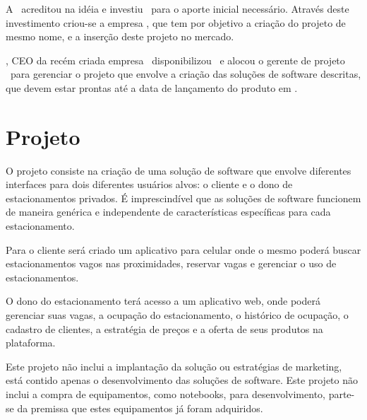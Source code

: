 A \investorCompanyName{}\ acreditou na idéia e investiu \ventureBudget{}\ para o aporte inicial necessário. Através deste investimento criou-se a empresa \startupCompanyName{}, que tem por objetivo a criação do projeto de mesmo nome, e a inserção deste projeto no mercado.

\ceoName{}, CEO da recém criada empresa \startupCompanyName{}\, disponibilizou \maximumBudget{}\ e alocou o gerente de projeto \projectManagerName{}\ para gerenciar o projeto que envolve a criação das soluções de software descritas, que devem estar prontas até a data de lançamento do produto em \maximumDeadline{}.



\section{Projeto}

O projeto consiste na criação de uma solução de software que envolve diferentes interfaces para dois diferentes usuários alvos: o cliente e o dono de estacionamentos privados. É imprescindível que as soluções de software funcionem de maneira genérica e independente de características específicas para cada estacionamento. 

Para o cliente será criado um aplicativo para celular onde o mesmo poderá buscar estacionamentos vagos nas proximidades, reservar vagas e gerenciar o uso de estacionamentos.

O dono do estacionamento terá acesso a um aplicativo web, onde poderá gerenciar suas vagas, a ocupação do estacionamento, o histórico de ocupação, o cadastro de clientes, a estratégia de preços e a oferta de seus produtos na plataforma.

Este projeto não inclui a implantação da solução ou estratégias de marketing, está contido apenas o desenvolvimento das soluções de software. Este projeto não inclui a compra de equipamentos, como notebooks, para desenvolvimento, parte-se da premissa que estes equipamentos já foram adquiridos.